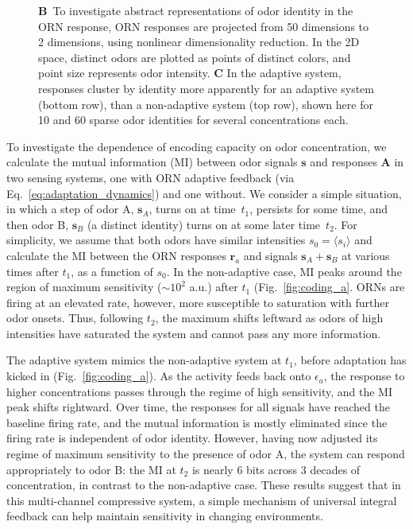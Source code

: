 \documentclass[9pt,twocolumn,twoside,lineno]{pnas-new}
\begin{document}
\begin{figure}[!tb]
{{			\textbf{B}~To investigate abstract representations of odor identity in the ORN response, ORN responses are projected from 50 dimensions to 2 dimensions, using nonlinear dimensionality reduction. In the 2D space, distinct odors are plotted as points of distinct colors, and point size represents odor intensity. 
			\textbf{C} In the adaptive system, responses cluster by identity more apparently for an adaptive system (bottom row), than a non-adaptive system (top row), shown here for 10 and 60 sparse odor identities for several concentrations each.}} %
	\label{fig:coding}
\end{figure}

To investigate the dependence of encoding capacity on odor concentration, we calculate the mutual information (MI) between odor signals $\mathbf s$ and responses $\mathbf A$ in two sensing systems, one with ORN adaptive feedback (via Eq.~\ref{eq:adaptation_dynamics}) and one without. We consider a simple situation, in which a step of odor A, $\textbf{s}_A$,  turns on at time~$t_1$, persists for some time, and then odor B, $\mathbf s_B$ (a distinct identity) turns on at some later time~$t_2$. For simplicity, we assume that both odors have similar intensities $s_0 = \langle s_i \rangle$ and calculate the MI between the ORN responses $\mathbf {r}_a$ and signals $\mathbf s_A + \mathbf s_B$ at various times after $t_1$, as a function of $s_0$. In the non-adaptive case, MI peaks around the region of maximum sensitivity ($\sim 10^2$ a.u.) after $t_1$ (Fig.~\ref{fig:coding_a}. ORNs are firing at an elevated rate, however, more susceptible to saturation with further odor onsets. Thus, following $t_2$, the maximum shifts leftward as odors of high intensities have saturated the system and cannot pass any more information.

The adaptive system mimics the non-adaptive system at $t_1$,  before adaptation has kicked in (Fig.~\ref{fig:coding_a}). As the activity feeds back onto $\epsilon_a$, the response to higher concentrations passes through the regime of high sensitivity, and the MI peak shifts rightward. Over time, the responses for all signals have reached the baseline firing rate, and the mutual information is mostly eliminated since the firing rate is independent of odor identity. However, having now adjusted its regime of maximum sensitivity to the presence of odor A, the system can respond appropriately to odor B: the MI at $t_2$ is nearly 6 bits across 3 decades of concentration, in contrast to the non-adaptive case. These results suggest that in this multi-channel compressive system, a simple mechanism of universal integral feedback can help maintain sensitivity in changing environments.
\end{document}
